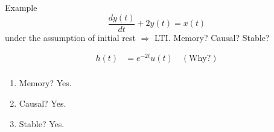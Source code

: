 \begin{frame}{Example}
    \begin{equation*}
        \frac{dy(t)}{dt} +2y(t) = x(t)
    \end{equation*}
    under the assumption of initial rest $\Rightarrow$ LTI.
    Memory? Causal? Stable?
    \pause
    {
        \begin{align*}
          h(t) &= e^{-2t}u(t) \quad (\text{Why?})\\
        \end{align*}
        \pause
            \begin{enumerate}
              \item Memory? Yes.
              \item Causal? Yes.
              \item Stable? Yes.
            \end{enumerate}
    }
\end{frame}


